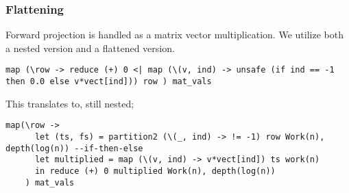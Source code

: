 \documentclass{beamer}
\begin{document}
\begin{frame}[fragile]
  \frametitle{Flattening}
  Forward projection is handled as a matrix vector multiplication. We utilize both a nested version and a flattened version. %
  \begin{lstlisting}[frame=single, language=Futhark]
    map (\row -> reduce (+) 0 <| map (\(v, ind) -> unsafe (if ind == -1 then 0.0 else v*vect[ind])) row ) mat_vals
  \end{lstlisting}
  This translates to, still nested;
  \begin{lstlisting}[frame=single, language=Futhark]
    map(\row ->
      let (ts, fs) = partition2 (\(_, ind) -> != -1) row Work(n), depth(log(n)) --if-then-else
      let multiplied = map (\(v, ind) -> v*vect[ind]) ts work(n)
      in reduce (+) 0 multiplied Work(n), depth(log(n))
    ) mat_vals
  \end{lstlisting}
\end{frame}
%
%
\end{document}
